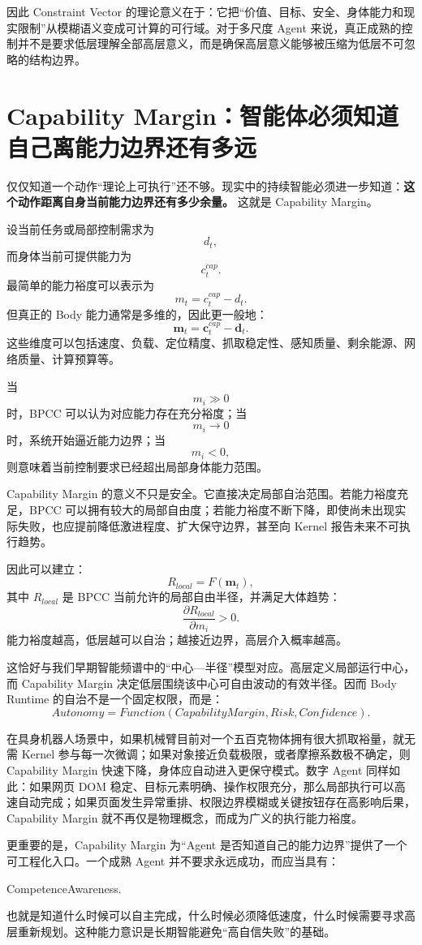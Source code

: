 因此 Constraint Vector 的理论意义在于：它把“价值、目标、安全、身体能力和现实限制”从模糊语义变成可计算的可行域。对于多尺度 Agent 来说，真正成熟的控制并不是要求低层理解全部高层意义，而是确保高层意义能够被压缩为低层不可忽略的结构边界。

\section{Capability Margin：智能体必须知道自己离能力边界还有多远}

仅仅知道一个动作“理论上可执行”还不够。现实中的持续智能必须进一步知道：\textbf{这个动作距离自身当前能力边界还有多少余量。} 这就是 Capability Margin。

设当前任务或局部控制需求为
\[
d_t,
\]
而身体当前可提供能力为
\[
c_t^{cap}.
\]
最简单的能力裕度可以表示为
\[
m_t
=
c_t^{cap}
-
d_t.
\]
但真正的 Body 能力通常是多维的，因此更一般地：
\[
\mathbf m_t
=
\mathbf c_t^{cap}
-
\mathbf d_t.
\]
这些维度可以包括速度、负载、定位精度、抓取稳定性、感知质量、剩余能源、网络质量、计算预算等。

当
\[
m_i\gg0
\]
时，BPCC 可以认为对应能力存在充分裕度；当
\[
m_i\rightarrow0
\]
时，系统开始逼近能力边界；当
\[
m_i<0,
\]
则意味着当前控制要求已经超出局部身体能力范围。

Capability Margin 的意义不只是安全。它直接决定局部自治范围。若能力裕度充足，BPCC 可以拥有较大的局部自由度；若能力裕度不断下降，即使尚未出现实际失败，也应提前降低激进程度、扩大保守边界，甚至向 Kernel 报告未来不可执行趋势。

因此可以建立：
\[
R_{local}
=
F(\mathbf m_t),
\]
其中 $R_{local}$ 是 BPCC 当前允许的局部自由半径，并满足大体趋势：
\[
\frac{\partial R_{local}}
{\partial m_i}
>0.
\]
能力裕度越高，低层越可以自治；越接近边界，高层介入概率越高。

这恰好与我们早期智能频谱中的“中心—半径”模型对应。高层定义局部运行中心，而 Capability Margin 决定低层围绕该中心可自由波动的有效半径。因而 Body Runtime 的自治不是一个固定权限，而是：
\[
\boxed{
Autonomy
=
Function(CapabilityMargin,Risk,Confidence).
}
\]

在具身机器人场景中，如果机械臂目前对一个五百克物体拥有很大抓取裕量，就无需 Kernel 参与每一次微调；如果对象接近负载极限，或者摩擦系数极不确定，则 Capability Margin 快速下降，身体应自动进入更保守模式。数字 Agent 同样如此：如果网页 DOM 稳定、目标元素明确、操作权限充分，那么局部执行可以高速自动完成；如果页面发生异常重排、权限边界模糊或关键按钮存在高影响后果，Capability Margin 就不再仅是物理概念，而成为广义的执行能力裕度。

更重要的是，Capability Margin 为“Agent 是否知道自己的能力边界”提供了一个可工程化入口。一个成熟 Agent 并不要求永远成功，而应当具有：
\begin{statementbox}
CompetenceAwareness.
\end{statementbox}
也就是知道什么时候可以自主完成，什么时候必须降低速度，什么时候需要寻求高层重新规划。这种能力意识是长期智能避免“高自信失败”的基础。

